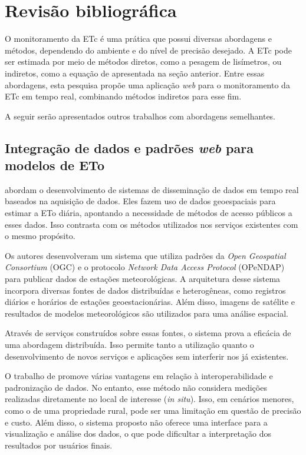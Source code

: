 \section{Revisão bibliográfica}

O monitoramento da ETc é uma prática que possui diversas abordagens e métodos, dependendo do ambiente e do nível de precisão desejado. A ETc pode ser estimada por meio de métodos diretos, como a pesagem de lisímetros, ou indiretos, como a equação de \textcite{Allen_evapotranspiration1998} apresentada na seção anterior. Entre essas abordagens, esta pesquisa propõe uma aplicação \textit{web} para o monitoramento da ETc em tempo real, combinando métodos indiretos para esse fim.

A seguir serão apresentados outros trabalhos com abordagens semelhantes.

\subsection{Integração de dados e padrões \textit{web} para modelos de ETo}

\textcite{Jianting_webeva2009} abordam o desenvolvimento de sistemas de disseminação de dados em tempo real baseados na aquisição de dados. Eles fazem uso de dados geoespaciais para estimar a ETo diária, apontando a necessidade de métodos de acesso públicos a esses dados. Isso contrasta com os métodos utilizados nos serviços existentes com o mesmo propósito.

Os autores desenvolveram um sistema que utiliza padrões da \textit{Open Geospatial Consortium} (OGC) e o protocolo \textit{Network Data Access Protocol} (OPeNDAP) para publicar dados de estações meteorológicas. A arquitetura desse sistema incorpora diversas fontes de dados distribuídas e heterogêneas, como registros diários e horários de estações geoestacionárias. Além disso, imagens de satélite e resultados de modelos meteorológicos são utilizados para uma análise espacial. 

Através de serviços construídos sobre essas fontes, o sistema prova a eficácia de uma abordagem distribuída. Isso permite tanto a utilização quanto o desenvolvimento de novos serviços e aplicações sem interferir nos já existentes.

O trabalho de \textcite{Jianting_webeva2009} promove várias vantagens em relação à interoperabilidade e padronização de dados. No entanto, esse método não considera medições realizadas diretamente no local de interesse (\textit{in situ}). Isso, em cenários menores, como o de uma propriedade rural, pode ser uma limitação em questão de precisão e custo. Além disso, o sistema proposto não oferece uma interface para a visualização e análise dos dados, o que pode dificultar a interpretação dos resultados por usuários finais.


